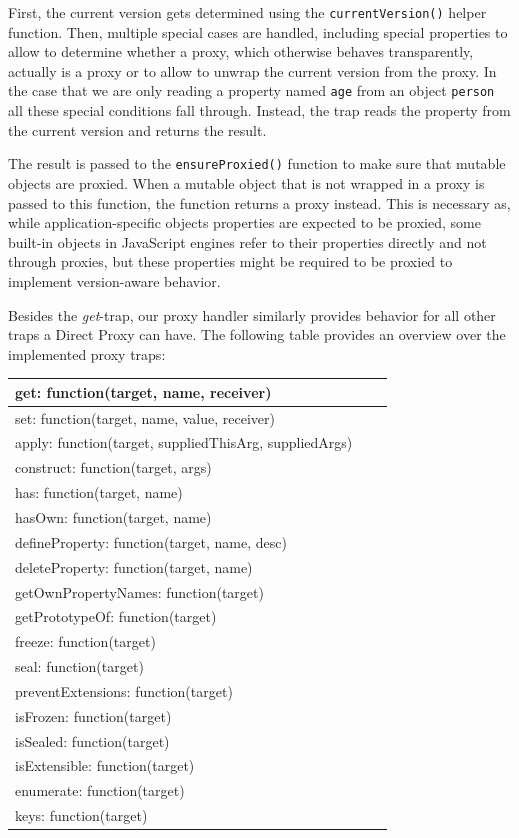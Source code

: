 
First, the current version gets determined using the \lstinline{currentVersion()} helper function.
Then, multiple special cases are handled, including special properties to allow to determine whether a proxy, which otherwise behaves transparently, actually is a proxy or to allow to unwrap the current version from the proxy.
In the case that we are only reading a property named \lstinline{age} from an object \lstinline{person} all these special conditions fall through.
Instead, the trap reads the property from the current version and returns the result.

The result is passed to the \lstinline{ensureProxied()} function to make sure that mutable objects are proxied.
When a mutable object that is not wrapped in a proxy is passed to this function, the function returns a proxy instead.
This is necessary as, while application-specific objects properties are expected to be proxied, some built-in objects in JavaScript engines refer to their properties directly and not through proxies, but these properties might be required to be proxied to implement version-aware behavior.

Besides the \emph{get}-trap, our proxy handler similarly provides behavior for all other traps a Direct Proxy can have.
The following table  provides an overview over the implemented proxy traps:

\begin{table}[h]
\begin{tabular}{|l|l|r|}
\hline
get: function(target, name, receiver) \\ \hline
set: function(target, name, value, receiver) \\ \hline
apply: function(target, suppliedThisArg, suppliedArgs) \\ \hline
construct: function(target, args) \\ \hline
has: function(target, name) \\ \hline
hasOwn: function(target, name) \\ \hline
defineProperty: function(target, name, desc) \\ \hline
deleteProperty: function(target, name) \\ \hline
getOwnPropertyNames: function(target) \\ \hline
getPrototypeOf: function(target) \\ \hline
freeze: function(target) \\ \hline
seal: function(target) \\ \hline
preventExtensions: function(target) \\ \hline
isFrozen: function(target) \\ \hline
isSealed: function(target) \\ \hline
isExtensible: function(target) \\ \hline
enumerate: function(target) \\ \hline
keys: function(target) \\ \hline
\end{tabular}
\end{table}

